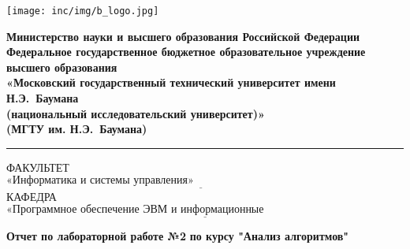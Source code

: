 \documentclass{bmstu}
\begin{document}
    \begin{titlepage}
        \fontsize{12pt}{12pt}\selectfont
        \noindent \begin{minipage}{0.15\textwidth}
                      \texttt{[image: inc/img/b\_logo.jpg]}
        \end{minipage}
        \noindent\begin{minipage}{0.9\textwidth}\centering
        \textbf{Министерство науки и высшего образования Российской Федерации}\\
        \textbf{Федеральное государственное бюджетное образовательное учреждение высшего образования}\\
        \textbf{«Московский государственный технический университет имени Н.Э.~Баумана}\\
        \textbf{(национальный исследовательский университет)»}\\
        \textbf{(МГТУ им. Н.Э.~Баумана)}
        \end{minipage}

        \noindent\rule{18cm}{3pt}
        \newline\newline
        \noindent ФАКУЛЬТЕТ $\underline{\text{«Информатика и системы управления»~~~~~~~~~~~~~~~~~~~~~~~~~~~~~~~~~~~~~~~~~~~~~~~~~~~~~~~}}$ \newline\newline
        \noindent КАФЕДРА $\underline{\text{«Программное обеспечение ЭВМ и информационные технологии»~~~~~~~~~~~~~~~~~~~~~~~}}$\newline\newline\newline\newline\newline\newline\newline


        \begin{center}
            \Large\textbf{Отчет по лабораторной работе №2}
            \Large\textbf{по курсу "Анализ алгоритмов"}
        \end{center}


\end{titlepage}
\end{document}
